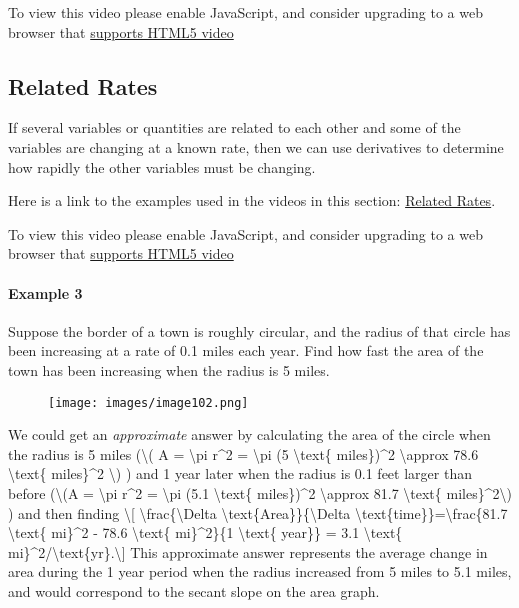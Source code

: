 To view this video please enable JavaScript, and consider upgrading to a
web browser that \href{http://videojs.com/html5-video-support/}{supports
HTML5 video}

\hypertarget{related-rates}{%
\subsection{Related Rates}\label{related-rates}}

If several variables or quantities are related to each other and some of
the variables are changing at a known rate, then we can use derivatives
to determine how rapidly the other variables must be changing.

Here is a link to the examples used in the videos in this section:
\href{otherfiles/related_rates_math141.pdf}{Related Rates}.

To view this video please enable JavaScript, and consider upgrading to a
web browser that \href{http://videojs.com/html5-video-support/}{supports
HTML5 video}

\hypertarget{example-3}{%
\paragraph{Example 3}\label{example-3}}

Suppose the border of a town is roughly circular, and the radius of that
circle has been increasing at a rate of 0.1 miles each year. Find how
fast the area of the town has been increasing when the radius is 5
miles.

\begin{figure}
\centering
\texttt{[image: images/image102.png]}
\caption{}
\end{figure}

We could get an \emph{approximate} answer by calculating the area of the
circle when the radius is 5 miles (\textbackslash{}( A =
\textbackslash{}pi r\^{}2 = \textbackslash{}pi (5 \textbackslash{}text\{
miles\})\^{}2 \textbackslash{}approx 78.6 \textbackslash{}text\{
miles\}\^{}2 \textbackslash{}) ) and 1 year later when the radius is 0.1
feet larger than before (\textbackslash{}(A = \textbackslash{}pi r\^{}2
= \textbackslash{}pi (5.1 \textbackslash{}text\{ miles\})\^{}2
\textbackslash{}approx 81.7 \textbackslash{}text\{
miles\}\^{}2\textbackslash{}) ) and then finding \textbackslash{}{[}
\textbackslash{}frac\{\textbackslash{}Delta
\textbackslash{}text\{Area\}\}\{\textbackslash{}Delta
\textbackslash{}text\{time\}\}=\textbackslash{}frac\{81.7
\textbackslash{}text\{ mi\}\^{}2 - 78.6 \textbackslash{}text\{
mi\}\^{}2\}\{1 \textbackslash{}text\{ year\}\} = 3.1
\textbackslash{}text\{
mi\}\^{}2/\textbackslash{}text\{yr\}.\textbackslash{}{]} This
approximate answer represents the average change in area during the 1
year period when the radius increased from 5 miles to 5.1 miles, and
would correspond to the secant slope on the area graph.

